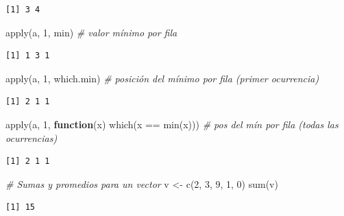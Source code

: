\documentclass[
]{book}
\newenvironment{Shaded}{\begin{snugshade}}{\end{snugshade}}
\newcommand{\CommentTok}[1]{\textcolor[rgb]{0.56,0.35,0.01}{\textit{#1}}}
\newcommand{\ControlFlowTok}[1]{\textcolor[rgb]{0.13,0.29,0.53}{\textbf{#1}}}
\newcommand{\DecValTok}[1]{\textcolor[rgb]{0.00,0.00,0.81}{#1}}
\newcommand{\FunctionTok}[1]{\textcolor[rgb]{0.00,0.00,0.00}{#1}}
\newcommand{\NormalTok}[1]{#1}
\newcommand{\OtherTok}[1]{\textcolor[rgb]{0.56,0.35,0.01}{#1}}
\newcommand{\SpecialCharTok}[1]{\textcolor[rgb]{0.00,0.00,0.00}{#1}}
\begin{document}
\begin{verbatim}
[1] 3 4
\end{verbatim}

\begin{Shaded}
\begin{Highlighting}[]
\FunctionTok{apply}\NormalTok{(a, }\DecValTok{1}\NormalTok{, min) }\CommentTok{\# valor mínimo por fila}
\end{Highlighting}
\end{Shaded}

\begin{verbatim}
[1] 1 3 1
\end{verbatim}

\begin{Shaded}
\begin{Highlighting}[]
\FunctionTok{apply}\NormalTok{(a, }\DecValTok{1}\NormalTok{, which.min) }\CommentTok{\# posición del mínimo por fila (primer ocurrencia)}
\end{Highlighting}
\end{Shaded}

\begin{verbatim}
[1] 2 1 1
\end{verbatim}

\begin{Shaded}
\begin{Highlighting}[]
\FunctionTok{apply}\NormalTok{(a, }\DecValTok{1}\NormalTok{, }\ControlFlowTok{function}\NormalTok{(x) }\FunctionTok{which}\NormalTok{(x }\SpecialCharTok{==} \FunctionTok{min}\NormalTok{(x))) }\CommentTok{\# pos del mín por fila (todas las ocurrencias)}
\end{Highlighting}
\end{Shaded}

\begin{verbatim}
[1] 2 1 1
\end{verbatim}

\begin{Shaded}
\begin{Highlighting}[]
\CommentTok{\# Sumas y promedios para un vector}
\NormalTok{v }\OtherTok{\textless{}{-}} \FunctionTok{c}\NormalTok{(}\DecValTok{2}\NormalTok{, }\DecValTok{3}\NormalTok{, }\DecValTok{9}\NormalTok{, }\DecValTok{1}\NormalTok{, }\DecValTok{0}\NormalTok{)}
\FunctionTok{sum}\NormalTok{(v)}
\end{Highlighting}
\end{Shaded}

\begin{verbatim}
[1] 15
\end{verbatim}
\end{document}
